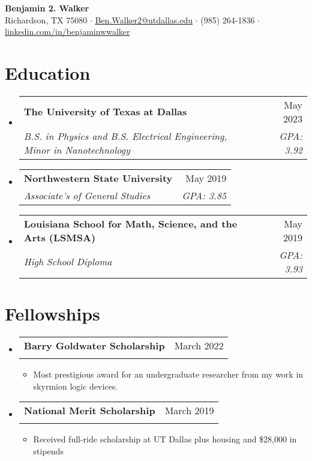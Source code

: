 \documentclass[letterpaper,11pt]{article}
\makeatletter
\newcommand{\resumeItem}[1]{
  \item\small{
    {#1 \vspace{-2pt}}
  }
}
\newcommand{\resumeSubheading}[4]{
  \vspace{-2pt}\item
    \begin{tabular*}{0.97\textwidth}[t]{l@{\extracolsep{\fill}}r}
      \textbf{#1} & #2 \\
      \textit{\small#3} & \textit{\small #4} \\
    \end{tabular*}\vspace{-7pt}
}
\newcommand{\resumeSubHeadingListStart}{\begin{itemize}[leftmargin=0.15in, label={}]}
\newcommand{\resumeSubHeadingListEnd}{\end{itemize}}
\newcommand{\resumeItemListStart}{\begin{itemize}}
\newcommand{\resumeItemListEnd}{\end{itemize}\vspace{-5pt}}
\makeatother
\begin{document}
\begin{center}
    \textbf{\Large Benjamin 2. Walker} \\ \vspace{5pt}
    Richardson, TX 75080
    \hspace{1 pt} $\cdot$ \hspace{1 pt}
    \href{mailto:Ben.Walker2@utdallas.edu}{{Ben.Walker2@utdallas.edu}} 
    \hspace{1 pt} $\cdot$ \hspace{1 pt}
    (985) 264-1836
    \hspace{1 pt} $\cdot$ \hspace{1 pt}
    \href{https://www.linkedin.com/in/benjaminwwalker/}{{linkedin.com/in/benjaminwwalker}}
    \vspace{-10pt}
\end{center}

\vspace{-10pt}


\section{Education}
  \resumeSubHeadingListStart
    \resumeSubheading
      {The University of Texas at Dallas}{May 2023}
      {B.S. in Physics and B.S. Electrical Engineering, Minor in Nanotechnology}{GPA: 3.92}
    \resumeSubheading
      {Northwestern State University}{May 2019}
      {Associate's of General Studies}{GPA: 3.85}
    \resumeSubheading
    {Louisiana School for Math, Science, and the Arts \normalfont(LSMSA)}{May 2019}
    {High School Diploma}{GPA: 3.93}
  \resumeSubHeadingListEnd
\section{Fellowships}
\resumeSubHeadingListStart
      
    \resumeSubheading
      {Barry Goldwater Scholarship}{March 2022}
      {}{}
      \vspace{-18px}
      \resumeItemListStart
        \resumeItem{Most prestigious award for an undergraduate researcher from my work in skyrmion logic devices.}
      \resumeItemListEnd
    \resumeSubheading
      {National Merit Scholarship}{March 2019}
      {}{}
      \vspace{-18px}
      \resumeItemListStart
        \resumeItem{Received full-ride scholarship at UT Dallas plus housing and \$28,000 in stipends}
      \resumeItemListEnd
    \resumeSubHeadingListEnd
\vspace{-20 pt}
\end{document}
